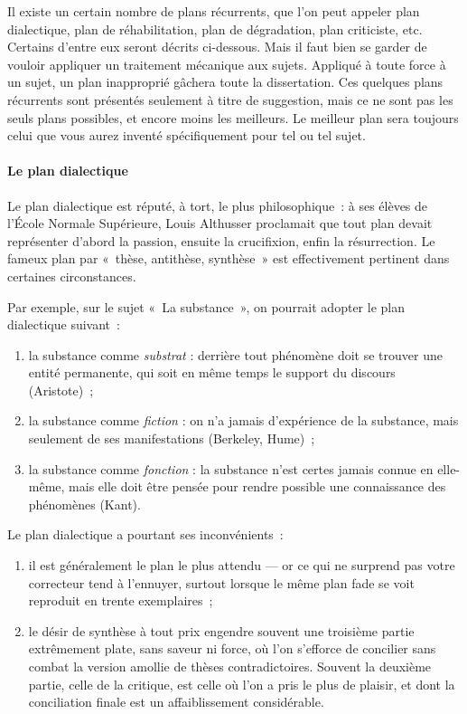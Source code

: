 \documentclass[a4paper,12pt]{article}
\begin{document}
Il existe un certain nombre de plans récurrents, que l'on peut appeler
plan dialectique, plan de réhabilitation, plan de dégradation, plan
criticiste, etc. Certains d'entre eux seront décrits ci-dessous. Mais il
faut bien se garder de vouloir appliquer un traitement mécanique aux
sujets. Appliqué à toute force à un sujet, un plan inapproprié gâchera
toute la dissertation. Ces quelques plans récurrents sont présentés
seulement à titre de suggestion, mais ce ne sont pas les seuls plans
possibles, et encore moins les meilleurs. Le meilleur plan sera toujours
celui que vous aurez inventé spécifiquement pour tel ou tel sujet.

\paragraph{Le plan dialectique}
\label{sec-2-4-2-1}

Le plan dialectique est réputé, à tort, le plus philosophique : à ses
élèves de l'École Normale Supérieure, Louis Althusser proclamait que
tout plan devait représenter d'abord la passion, ensuite la crucifixion,
enfin la résurrection. Le fameux plan par « thèse, antithèse, synthèse »
est effectivement pertinent dans certaines circonstances.

Par exemple, sur le sujet « La substance », on pourrait adopter le plan
dialectique suivant :

\begin{enumerate}
\item la substance comme \emph{substrat} : derrière tout phénomène doit se
trouver une entité permanente, qui soit en même temps le support du
discours (Aristote) ;

\item la substance comme \emph{fiction} : on n'a jamais d'expérience de la
substance, mais seulement de ses manifestations (Berkeley, Hume) ;

\item la substance comme \emph{fonction} : la substance n'est certes jamais
connue en elle-même, mais elle doit être pensée pour rendre possible
une connaissance des phénomènes (Kant).
\end{enumerate}

Le plan dialectique a pourtant ses inconvénients :

\begin{enumerate}
\item il est généralement le plan le plus attendu --- or ce qui ne surprend
pas votre correcteur tend à l'ennuyer, surtout lorsque le même plan
fade se voit reproduit en trente exemplaires ;

\item le désir de synthèse à tout prix engendre souvent une troisième
partie extrêmement plate, sans saveur ni force, où l'on s'efforce de
concilier sans combat la version amollie de thèses contradictoires.
Souvent la deuxième partie, celle de la critique, est celle où l'on a
pris le plus de plaisir, et dont la conciliation finale est un
affaiblissement considérable.
\end{enumerate}
\end{document}

